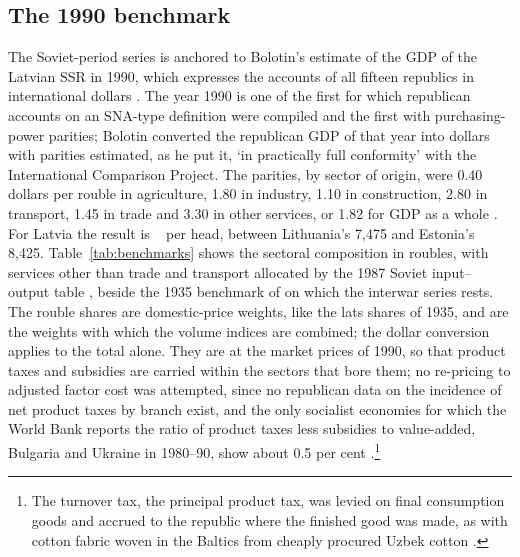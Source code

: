 \subsection{The 1990 benchmark}

The Soviet-period series is anchored to Bolotin's estimate of the GDP of the Latvian SSR in 1990, which expresses the accounts of all fifteen republics in international dollars \parencite[181--92]{bolotin1992}. The year 1990 is one of the first for which republican accounts on an SNA-type definition were compiled \parencite[43--4]{gulans_2015_rupnieciba} and the first with purchasing-power parities; Bolotin converted the republican GDP of that year into dollars with parities estimated, as he put it, `in practically full conformity' with the International Comparison Project. The parities, by sector of origin, were 0.40 dollars per rouble in agriculture, 1.80 in industry, 1.10 in construction, 2.80 in transport, 1.45 in trade and 3.30 in other services, or 1.82 for GDP as a whole \parencite[181, 184]{bolotin1992}. For Latvia the result is ~\intlnineteen{} per head, between Lithuania's 7,475 and Estonia's 8,425. Table~\ref{tab:benchmarks} shows the sectoral composition in roubles, with services other than trade and transport allocated by the 1987 Soviet input--output table \parencite{wbinputoutput1987}, beside the 1935 benchmark of \textcite{norkuslatvia1935} on which the interwar series rests. The rouble shares are domestic-price weights, like the lats shares of 1935, and are the weights with which the volume indices are combined; the dollar conversion applies to the total alone. They are at the market prices of 1990, so that product taxes and subsidies are carried within the sectors that bore them; no re-pricing to adjusted factor cost was attempted, since no republican data on the incidence of net product taxes by branch exist, and the only socialist economies for which the World Bank reports the ratio of product taxes less subsidies to value-added, Bulgaria and Ukraine in 1980--90, show about 0.5 per cent \parencite{wdi2024}.\footnote{The turnover tax, the principal product tax, was levied on final consumption goods and accrued to the republic where the finished good was made, as with cotton fabric woven in the Baltics from cheaply procured Uzbek cotton \parencite[20]{yasin_1993_economic}.}



